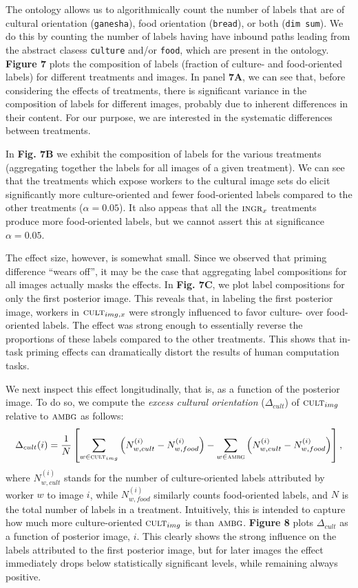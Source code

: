 \documentclass[a4paper]{report}
\begin{document}
The ontology allows us to algorithmically count the number of labels that are
of cultural orientation (\texttt{ganesha}),  food orientation
(\texttt{bread}), or both (\texttt{dim sum}).  We do this by counting the
number of labels having have inbound paths leading from the abstract clasess 
\texttt{culture} and/or \texttt{food}, which are present in the ontology.
\textbf{Figure 7} plots the composition of labels (fraction of culture- and 
food-oriented labels) for different treatments and images.  In 
panel \textbf{7A}, we can see that, before considering the effects of 
treatments, there is significant variance in the composition of labels 
for different images, probably due to inherent differences in their content.  
For our purpose, we are interested in the systematic differences between 
treatments.

In \textbf{Fig. 7B} we exhibit the composition of labels for the various 
treatments (aggregating together the labels for all images of a given 
treatment).  We can see that the treatments which expose workers to the
cultural image sets do elicit significantly more culture-oriented and fewer
food-oriented labels compared to the other treatments ($\alpha=0.05$).  It 
also appeas that all the $\textsc{ingr}_x$ treatments produce more 
food-oriented labels, but we cannot assert this at significance 
$\alpha = 0.05$. 

The effect size, however, is somewhat small.  Since we observed that priming 
difference ``wears off'', it may be the case 
that aggregating label compositions for all images actually masks the effects. 
In \textbf{Fig. 7C}, we plot label compositions for only the first posterior
image.  This reveals that, in labeling the first posterior image, workers in 
$\textsc{cult}_{img,x}$ were strongly influenced to favor culture- over 
food-oriented labels.  The effect was strong enough to essentially reverse 
the proportions of these labels compared to the other treatments.  
This shows that in-task priming effects can dramatically distort the results 
of human computation tasks.

We next inspect this effect longitudinally, that is, as a function of 
the posterior image.  To do so, we compute the \textit{excess cultural orientation} 
($\Delta_{cult}$) of
$\textsc{cult}_{img}$ relative to $\textsc{ambg}$ as follows: 
\begin{align}
	\Delta_{cult}(i) = \frac{1}{N}\left[ \sum_{w\in\textsc{cult}_{img}} \left(N_{w,cult}^{(i)} - N_{w,food}^{(i)}\right)
	- \sum_{w\in\textsc{ambg}} \left(N_{w,cult}^{(i)} - N_{w,food}^{(i)}\right)\right],
\end{align}
where $N_{w,cult}^{(i)}$ stands for the number of culture-oriented labels 
attributed by worker $w$ to image $i$, while $N_{w,food}^{(i)}$ similarly 
counts food-oriented labels, and $N$ is the total number of labels in a 
treatment.  
Intuitively, this is intended to capture how much 
more culture-oriented $\textsc{cult}_{img}$ is than $\textsc{ambg}$.  
\textbf{Figure 8} plots $\Delta_{cult}$ as a function of posterior image, $i$. 
This clearly shows the strong influence on the labels attributed to the first 
posterior image,
but for later images the effect immediately drops below statistically 
significant levels, while remaining always positive.
\end{document}
